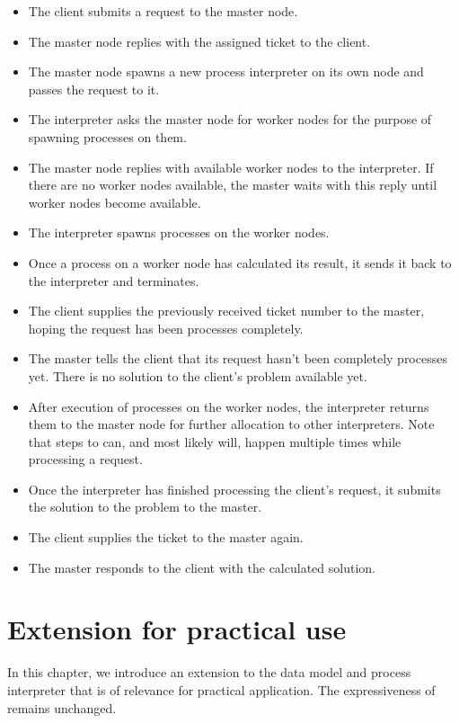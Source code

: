\begin{itemize}
  \item [\figannotation{1}] The client submits a request to the master node.
  \item [\figannotation{2}] The master node replies with the assigned ticket to the client.
  \item [\figannotation{3}] The master node spawns a new process interpreter on its own node and passes the request to it.
  \item [\figannotation{4}] The interpreter asks the master node for worker nodes for the purpose of spawning processes on them.
  \item [\figannotation{5}] The master node replies with available worker nodes to the interpreter. If there are no worker nodes available, the master waits with this reply until worker nodes become available.
  \item [\figannotation{6}] The interpreter spawns processes on the worker nodes.
  \item [\figannotation{7}] Once a process on a worker node has calculated its result, it sends it back to the interpreter and terminates.
  \item [\figannotation{8}] The client supplies the previously received ticket number to the master, hoping the request has been processes completely.
  \item [\figannotation{9}] The master tells the client that its request hasn't been completely processes yet. There is no solution to the client's problem available yet.
  \item [\figannotation{10}] After execution of processes on the worker nodes, the interpreter returns them to the master node for further allocation to other interpreters. Note that steps  to  can, and most likely will, happen multiple times while processing a request.
  \item [\figannotation{11}] Once the interpreter has finished processing the client's request, it submits the solution to the problem to the master.
  \item [\figannotation{12}] The client supplies the ticket to the master again.
  \item [\figannotation{13}] The master responds to the client with the calculated solution.
\end{itemize}


\section{Extension for practical use}
In this chapter, we introduce an extension to the data model and process interpreter that is of relevance for practical application. The expressiveness of remains unchanged.

